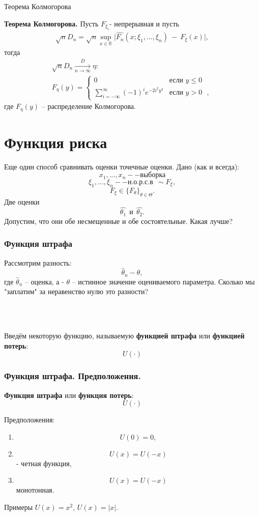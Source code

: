 \begin{frame}{Теорема Колмогорова}
\begin{theorem}
\textbf{Теорема Колмогорова.}
Пусть
$F_{\xi_i}$- непрерывная и пусть
\begin{eqnarray*}
\sqrt{n}D_n=
\sqrt{n}
\sup_{x \in  \mathbb{R}} 
    \big| \hat{F_n}(x; \xi_1,...,\xi_n) ~-~ F_{\xi}(x) \big|,
\end{eqnarray*}
тогда
\begin{eqnarray*}
\sqrt{n}D_n
    \xrightarrow[n \to \infty]{D}
    \eta:~~~~
    \\F_{\eta}(y)=
     \begin{cases}
      0 & \text{если $y \leqslant 0$ }\\
      \sum_{i=-\infty}^{\infty} (-1)^i e^{-2i^2y^2} & \text{если $y > 0$ },
    \end{cases}
\end{eqnarray*}
где $F_{\eta}(y)$ -- распределение Колмогорова.
\end{theorem}
\end{frame}

\section{Функция риска}

\begin{frame}{}
Еще  один способ сравнивать оценки точечные оценки.
Дано (как и всегда):
$$
x_1,...,x_n -- \text{выборка}
$$
$$
\xi_1,...,\xi_n -- \text{н.о.р.с.в} ~~\sim F_{\xi},
$$
$$
F_{\xi} \in \{F_{\theta} \}_{\theta \in \Theta}.
$$
Две оценки
$$
\hat{\theta_1}~~\text{и}~~\hat{\theta_2}.
$$
 Допустим, что они обе несмещенные и обе состоятельные. Какая лучше?
 
\end{frame}


\begin{frame}
\frametitle{Функция штрафа}
Рассмотрим разность:
$$
\hat{\theta}_n - \theta,
$$
где $\hat{\theta}_n$ -- оценка, а - $\theta$ -- истинное значение оцениваемого параметра. Сколько мы "заплатим" за неравенство нулю это разности?

~
~
\\
~


Введём некоторую функцию, называемую \textbf{функцией штрафа}  или \textbf{функцией потерь}:
 $$
 U(\cdot)
 $$


\end{frame}


\begin{frame}
\frametitle{Функция штрафа. Предположения.}

\textbf{Функция штрафа}  или \textbf{функция потерь}:
 $$
 U(\cdot)
 $$

Предположения:
\begin{enumerate}
    \item $$
U(0)=0,
$$
\item
$$
U(x)=U(-x) 
$$
- четная функция,
\item
$$
U(x)=U(-x) 
$$
монотонная.
\end{enumerate}




Примеры
$U(x)=x^2$, $U(x)=|x|$.
\end{frame}


